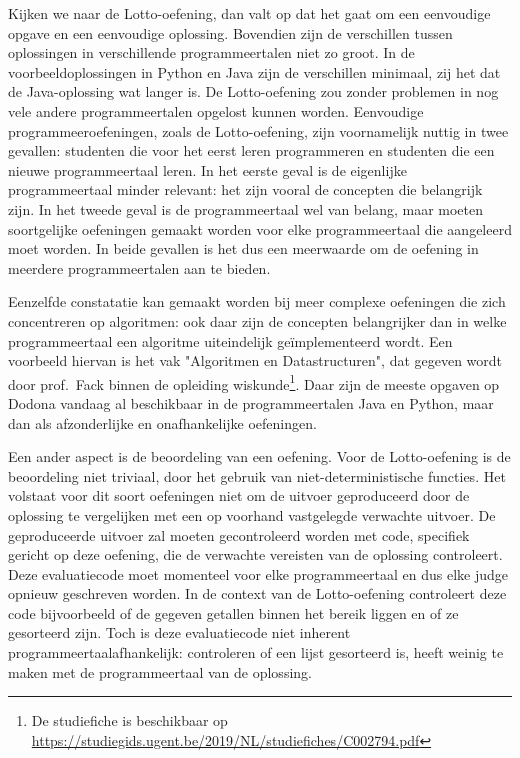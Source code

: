 Kijken we naar de Lotto-oefening, dan valt op dat het gaat om een eenvoudige opgave en een eenvoudige oplossing.
Bovendien zijn de verschillen tussen oplossingen in verschillende programmeertalen niet zo groot.
In de voorbeeldoplossingen in Python en Java zijn de verschillen minimaal, zij het dat de Java-oplossing wat langer is.
De Lotto-oefening zou zonder problemen in nog vele andere programmeertalen opgelost kunnen worden.
Eenvoudige programmeeroefeningen, zoals de Lotto-oefening, zijn voornamelijk nuttig in twee gevallen: studenten die voor het eerst leren programmeren en studenten die een nieuwe programmeertaal leren.
In het eerste geval is de eigenlijke programmeertaal minder relevant: het zijn vooral de concepten die belangrijk zijn.
In het tweede geval is de programmeertaal wel van belang, maar moeten soortgelijke oefeningen gemaakt worden voor elke programmeertaal die aangeleerd moet worden.
In beide gevallen is het dus een meerwaarde om de oefening in meerdere programmeertalen aan te bieden.

Eenzelfde constatatie kan gemaakt worden bij meer complexe oefeningen die zich concentreren op algoritmen: ook daar zijn de concepten belangrijker dan in welke programmeertaal een algoritme uiteindelijk geïmplementeerd wordt.
Een voorbeeld hiervan is het vak "Algoritmen en Datastructuren", dat gegeven wordt door prof.\ Fack binnen de opleiding wiskunde\footnote{De studiefiche is beschikbaar op \url{https://studiegids.ugent.be/2019/NL/studiefiches/C002794.pdf}}.
Daar zijn de meeste opgaven op Dodona vandaag al beschikbaar in de programmeertalen Java en Python, maar dan als afzonderlijke en onafhankelijke oefeningen.

Een ander aspect is de beoordeling van een oefening.
Voor de Lotto-oefening is de beoordeling niet triviaal, door het gebruik van niet-deterministische functies.
Het volstaat voor dit soort oefeningen niet om de uitvoer geproduceerd door de oplossing te vergelijken met een op voorhand vastgelegde verwachte uitvoer.
De geproduceerde uitvoer zal moeten gecontroleerd worden met code, specifiek gericht op deze oefening, die de verwachte vereisten van de oplossing controleert.
Deze evaluatiecode moet momenteel voor elke programmeertaal en dus elke judge opnieuw geschreven worden.
In de context van de Lotto-oefening controleert deze code bijvoorbeeld of de gegeven getallen binnen het bereik liggen en of ze gesorteerd zijn.
Toch is deze evaluatiecode niet inherent programmeertaalafhankelijk: controleren of een lijst gesorteerd is, heeft weinig te maken met de programmeertaal van de oplossing.

